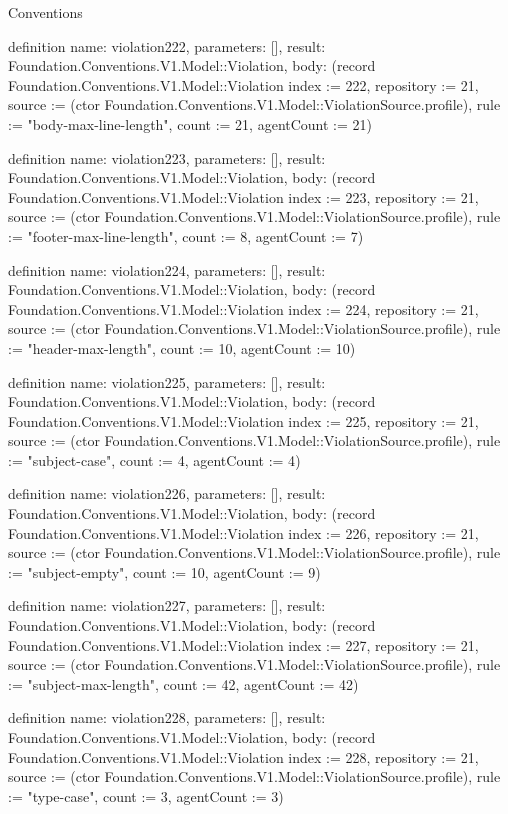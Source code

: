 \begin{lexlean}{Conventions}
\begin{semanticmodule}
definition{
  name: violation222,
  parameters: [],
  result: Foundation.Conventions.V1.Model::Violation,
  body: (record Foundation.Conventions.V1.Model::Violation {index := 222, repository := 21, source := (ctor Foundation.Conventions.V1.Model::ViolationSource.profile), rule := "body-max-line-length", count := 21, agentCount := 21})
}

definition{
  name: violation223,
  parameters: [],
  result: Foundation.Conventions.V1.Model::Violation,
  body: (record Foundation.Conventions.V1.Model::Violation {index := 223, repository := 21, source := (ctor Foundation.Conventions.V1.Model::ViolationSource.profile), rule := "footer-max-line-length", count := 8, agentCount := 7})
}

definition{
  name: violation224,
  parameters: [],
  result: Foundation.Conventions.V1.Model::Violation,
  body: (record Foundation.Conventions.V1.Model::Violation {index := 224, repository := 21, source := (ctor Foundation.Conventions.V1.Model::ViolationSource.profile), rule := "header-max-length", count := 10, agentCount := 10})
}

definition{
  name: violation225,
  parameters: [],
  result: Foundation.Conventions.V1.Model::Violation,
  body: (record Foundation.Conventions.V1.Model::Violation {index := 225, repository := 21, source := (ctor Foundation.Conventions.V1.Model::ViolationSource.profile), rule := "subject-case", count := 4, agentCount := 4})
}

definition{
  name: violation226,
  parameters: [],
  result: Foundation.Conventions.V1.Model::Violation,
  body: (record Foundation.Conventions.V1.Model::Violation {index := 226, repository := 21, source := (ctor Foundation.Conventions.V1.Model::ViolationSource.profile), rule := "subject-empty", count := 10, agentCount := 9})
}

definition{
  name: violation227,
  parameters: [],
  result: Foundation.Conventions.V1.Model::Violation,
  body: (record Foundation.Conventions.V1.Model::Violation {index := 227, repository := 21, source := (ctor Foundation.Conventions.V1.Model::ViolationSource.profile), rule := "subject-max-length", count := 42, agentCount := 42})
}

definition{
  name: violation228,
  parameters: [],
  result: Foundation.Conventions.V1.Model::Violation,
  body: (record Foundation.Conventions.V1.Model::Violation {index := 228, repository := 21, source := (ctor Foundation.Conventions.V1.Model::ViolationSource.profile), rule := "type-case", count := 3, agentCount := 3})
}


\end{semanticmodule}
\end{lexlean}
